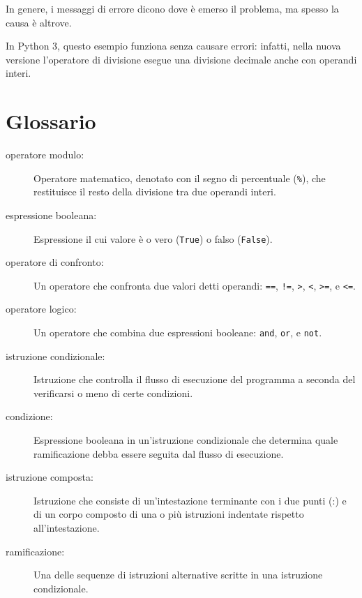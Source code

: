 \documentclass[10pt]{book}
\begin{document}
In genere, i messaggi di errore dicono dove è emerso il problema, ma spesso la causa è altrove.

In Python 3, questo esempio funziona senza causare errori: infatti, nella nuova versione l'operatore di divisione esegue una divisione decimale anche con operandi interi.


\section{Glossario}

\begin{description}

\item[operatore modulo:]  Operatore matematico, denotato con il segno di percentuale ({\tt \%}), che restituisce il resto della divisione tra due operandi
interi.

\item[espressione booleana:]  Espressione il cui valore è o vero 
({\tt True}) o falso ({\tt False}).

\item[operatore di confronto:] Un operatore che confronta due valori detti operandi: {\tt ==}, {\tt !=}, {\tt >}, {\tt <}, {\tt >=}, e {\tt <=}.

\item[operatore logico:] Un operatore che combina due espressioni booleane: {\tt and}, {\tt or}, e {\tt not}.

\item[istruzione condizionale:]  Istruzione che controlla il flusso di esecuzione del programma a seconda del verificarsi o meno di certe condizioni.

\item[condizione:] Espressione booleana in un'istruzione condizionale che      determina quale ramificazione debba essere seguita dal flusso di esecuzione.

\item[istruzione composta:]  Istruzione che consiste di un'intestazione terminante con i due punti (:) e di un corpo composto di una o più istruzioni
indentate rispetto all'intestazione.

\item[ramificazione:] Una delle sequenze di istruzioni alternative scritte in una istruzione condizionale.


\end{description}
\end{document}
